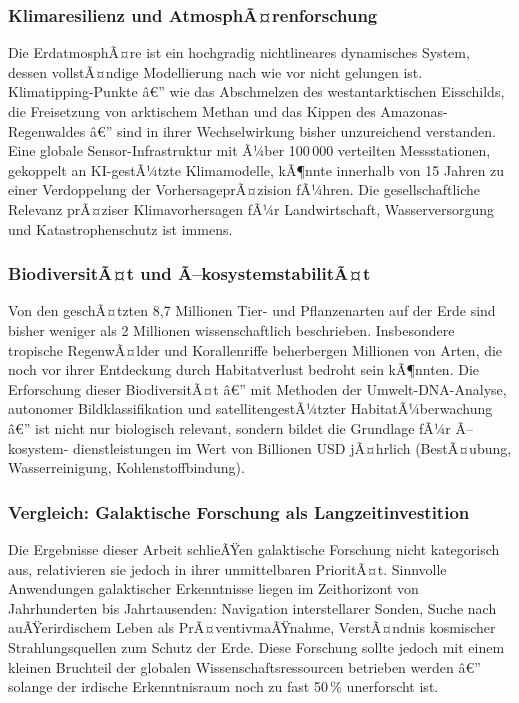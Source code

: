 ﻿\documentclass[a4paper,12pt]{article}
\theoremstyle{definition}
\begin{document}
\subsubsection{Klimaresilienz und AtmosphÃ¤renforschung}

Die ErdatmosphÃ¤re ist ein hochgradig nichtlineares dynamisches System, dessen
vollstÃ¤ndige Modellierung nach wie vor nicht gelungen ist. Klimatipping-Punkte
â€” wie das Abschmelzen des westantarktischen Eisschilds, die Freisetzung von
arktischem Methan und das Kippen des Amazonas-Regenwaldes â€” sind in ihrer
Wechselwirkung bisher unzureichend verstanden. Eine globale Sensor-Infrastruktur
mit Ã¼ber 100\,000 verteilten Messstationen, gekoppelt an KI-gestÃ¼tzte
Klimamodelle, kÃ¶nnte innerhalb von 15 Jahren zu einer Verdoppelung der
VorhersageprÃ¤zision fÃ¼hren. Die gesellschaftliche Relevanz prÃ¤ziser
Klimavorhersagen fÃ¼r Landwirtschaft, Wasserversorgung und Katastrophenschutz
ist immens.

\subsubsection{BiodiversitÃ¤t und Ã–kosystemstabilitÃ¤t}

Von den geschÃ¤tzten 8{,}7 Millionen Tier- und Pflanzenarten auf der Erde sind
bisher weniger als 2 Millionen wissenschaftlich beschrieben. Insbesondere
tropische RegenwÃ¤lder und Korallenriffe beherbergen Millionen von Arten, die
noch vor ihrer Entdeckung durch Habitatverlust bedroht sein kÃ¶nnten. Die
Erforschung dieser BiodiversitÃ¤t â€” mit Methoden der Umwelt-DNA-Analyse,
autonomer Bildklassifikation und satellitengestÃ¼tzter HabitatÃ¼berwachung â€”
ist nicht nur biologisch relevant, sondern bildet die Grundlage fÃ¼r Ã–kosystem-
dienstleistungen im Wert von Billionen USD jÃ¤hrlich (BestÃ¤ubung, Wasserreinigung,
Kohlenstoffbindung).

\subsubsection{Vergleich: Galaktische Forschung als Langzeitinvestition}

Die Ergebnisse dieser Arbeit schlieÃŸen galaktische Forschung nicht kategorisch
aus, relativieren sie jedoch in ihrer unmittelbaren PrioritÃ¤t. Sinnvolle
Anwendungen galaktischer Erkenntnisse liegen im Zeithorizont von Jahrhunderten
bis Jahrtausenden: Navigation interstellarer Sonden, Suche nach auÃŸerirdischem
Leben als PrÃ¤ventivmaÃŸnahme, VerstÃ¤ndnis kosmischer Strahlungsquellen zum
Schutz der Erde. Diese Forschung sollte jedoch mit einem kleinen Bruchteil der
globalen Wissenschaftsressourcen betrieben werden â€” solange der irdische
Erkenntnisraum noch zu fast 50\,\% unerforscht ist.
\end{document}
